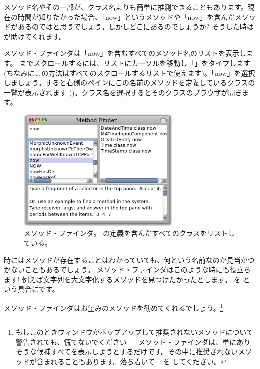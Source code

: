 \documentclass[a4paper,10pt,twoside]{book}
\begin{document}
メソッド名やその一部が、クラス名よりも簡単に推測できることもあります。現在の時間が知りたかった場合、「now」というメソッドや「now」を含んだメソッドがあるのではと思うでしょう。しかしどこにあるのでしょうか?
そうした時はが助けてくれます。

メソッド・ファインダは「now」を含むすべてのメソッド名のリストを表示します。
 までスクロールするには、リストにカーソルを移動し「」をタイプします(ちなみにこの方法はすべてのスクロールするリストで使えます)。「now」を選択しましょう。すると右側のペインにこの名前のメソッドを定義しているクラスの一覧が表示されます ()。クラス名を選択するとそのクラスのブラウザが開きます。

\begin{figure}[hbt]
\centerline {\includegraphics[width=0.7\textwidth]{methodFinder-now}}
\caption{メソッド・ファインダ。 の定義を含んだすべてのクラスをリストしている。
}
\end{figure}

時にはメソッドが存在することはわかっていても、何という名前なのか見当がつかないこともあるでしょう。
メソッド・ファインダはこのような時にも役立ちます! 例えば文字列を大文字化するメソッドを見つけたかったとします。 を  という具合にです。


\noindent
メソッド・ファインダはお望みのメソッドを勧めてくれるでしょう。\footnote{もしこのときウィンドウがポップアップして推奨されないメソッドについて警告されても、慌てないでください --- メソッド・ファインダは、単にありそうな候補すべてを表示しようとするだけです。その中に推奨されないメソッドが含まれることもあります。落ち着いて ~ を \click してください。}
\end{document}
